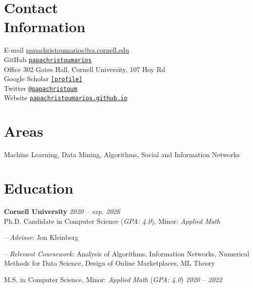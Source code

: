 \documentclass[margin]{res}
\newcommand{\field}[2]{\noindent \textbf{#1} \hfill #2 \\}
\newcommand{\specialurl}[2]{\href {#2} {\texttt{[#1]}}}
\begin{document}

\begin{resume}

\section{Contact \\ Information} 
E-mail \hfill \url{papachristoumarios@cs.cornell.edu} \\
GitHub \hfill \href{http://github.com/papachristoumarios}{\nolinkurl{papachristoumarios}} \\
Office \hfill 302 Gates Hall, Cornell University, 107 Hoy Rd \\
Google Scholar \hfill \specialurl{profile}{https://scholar.google.gr/citations?user=T12JO3MAAAAJ&hl=en} \\
Twitter \hfill \href{https://twitter.com/papachristoum}{\nolinkurl {@papachristoum}} \\
Website \hfill \href{https://papachristoumarios.github.io}{\nolinkurl {papachristoumarios.github.io}}

\section{Areas} Machine Learning, Data Mining, Algorithms, Social and Information Networks

\section{Education}
\field {Cornell University} {\emph{2020 -- exp. 2026}}
Ph.D. Candidate in Computer Science (\emph{GPA: 4.0}), Minor: \emph{Applied Math}
\begin{compactitem}
\item[--] \emph{Advisor:} Jon Kleinberg
\item[--] \emph{Relevant Coursework:} Analysis of Algorithms, Information Networks, Numerical Methods for Data Science, Design of Online Marketplaces, ML Theory
\end{compactitem} 

M.S. in Computer Science, Minor: \emph{Applied Math} (\emph{GPA: 4.0}) \hfill {\emph{2020 -- 2022}}
 

\end{resume}
\end{document}
